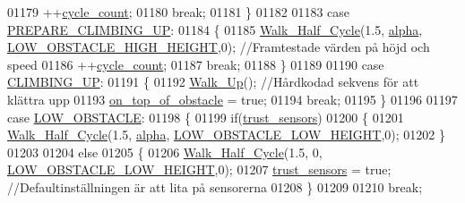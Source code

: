 \begin{DoxyCode}
01179             ++\hyperlink{state__machine_8c_a937f74a65988b9e22241ab3765b82c50}{cycle\_count};
01180             \textcolor{keywordflow}{break};
01181         \}
01182         
01183         \textcolor{keywordflow}{case} \hyperlink{state__machine_8h_a94b1da2e055fff4d143aa6aa891f79a9a16c309eb8317f88a8a0440d04f5020bd}{PREPARE\_CLIMBING\_UP}:
01184         \{
01185             \hyperlink{gangstilar_8c_a8b22e9229a15d20adb676428ad7f6dac}{Walk\_Half\_Cycle}(1.5, \hyperlink{state__machine_8c_ab1551d8043c2aa4410fb7dbb1fe3be7b}{alpha}, 
      \hyperlink{state__machine_8c_ae83c2d91c95c1caebd7ec550fa552bda}{LOW\_OBSTACLE\_HIGH\_HEIGHT},0); \textcolor{comment}{//Framtestade värden på höjd och speed}
01186             ++\hyperlink{state__machine_8c_a937f74a65988b9e22241ab3765b82c50}{cycle\_count};
01187             \textcolor{keywordflow}{break};
01188         \}
01189         
01190         \textcolor{keywordflow}{case} \hyperlink{state__machine_8h_a94b1da2e055fff4d143aa6aa891f79a9a3555ae926f7e1c144e6f5ff285b8a306}{CLIMBING\_UP}:
01191         \{
01192             \hyperlink{over__hinder_8c_afd0d93fa3f43053e101ed9d2dbfb0b3a}{Walk\_Up}(); \textcolor{comment}{//Hårdkodad sekvens för att klättra upp}
01193             \hyperlink{state__machine_8h_a7e6264018cf52dca4260c8f3b50125b4}{on\_top\_of\_obstacle} = \textcolor{keyword}{true};
01194             \textcolor{keywordflow}{break};
01195         \}
01196         
01197         \textcolor{keywordflow}{case} \hyperlink{state__machine_8h_a94b1da2e055fff4d143aa6aa891f79a9a10649b908487397730b45977dd2ceb20}{LOW\_OBSTACLE}:
01198         \{
01199             \textcolor{keywordflow}{if}(\hyperlink{state__machine_8h_ab10ef355c6ebe68985b8ee64030b0926}{trust\_sensors})
01200             \{
01201                 \hyperlink{gangstilar_8c_a8b22e9229a15d20adb676428ad7f6dac}{Walk\_Half\_Cycle}(1.5, \hyperlink{state__machine_8c_ab1551d8043c2aa4410fb7dbb1fe3be7b}{alpha}, 
      \hyperlink{state__machine_8c_a5a932f3126d97c8923f98754faf63422}{LOW\_OBSTACLE\_LOW\_HEIGHT},0);
01202             \}
01203             
01204             \textcolor{keywordflow}{else}
01205             \{
01206                 \hyperlink{gangstilar_8c_a8b22e9229a15d20adb676428ad7f6dac}{Walk\_Half\_Cycle}(1.5, 0, \hyperlink{state__machine_8c_a5a932f3126d97c8923f98754faf63422}{LOW\_OBSTACLE\_LOW\_HEIGHT},0);
01207                 \hyperlink{state__machine_8h_ab10ef355c6ebe68985b8ee64030b0926}{trust\_sensors} = \textcolor{keyword}{true}; \textcolor{comment}{//Defaultinställningen är att lita på sensorerna}
01208             \}
01209             
01210             \textcolor{keywordflow}{break};

\end{DoxyCode}
